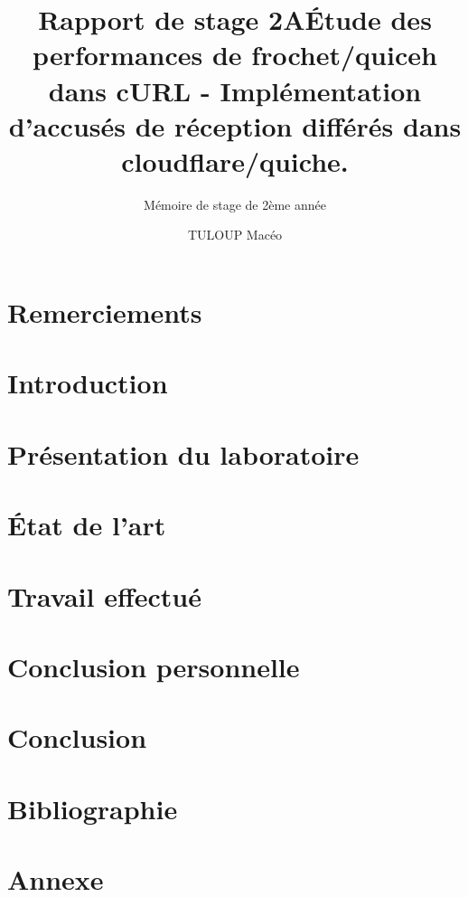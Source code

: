 \documentclass{rapport_de_stage}
\title{Rapport de stage 2A} %
\title{Étude des performances de frochet/quiceh dans cURL - Implémentation d'accusés de réception différés dans cloudflare/quiche.}
\subtitle{Mémoire de stage de 2ème année}
\author{TULOUP Macéo}
\begin{document}
\maketitle

\section{Remerciements}

\newpage



\newpage

\toc %



\section{Introduction}

\newpage


\section{Présentation du laboratoire}

\newpage


\section{État de l'art}

\newpage


\section{Travail effectué}

\newpage


\section{Conclusion personnelle}

\newpage


\section{Conclusion} 

\newpage


\section{Bibliographie}

\newpage


\section{Annexe}

\newpage
\end{document}
